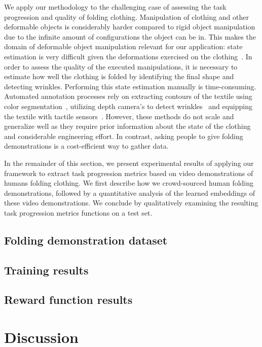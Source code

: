 \documentclass[\home/main.tex]{subfiles}
\begin{document}

We apply our methodology to the challenging case of assessing the task progression and quality of folding clothing. Manipulation of clothing and other deformable objects is considerably harder compared to rigid object manipulation due to the infinite amount of configurations the object can be in. This makes the domain of deformable object manipulation relevant for our application: state estimation is very difficult given the deformations exercised on the clothing~\cite{Foresti2004}. In order to assess the quality of the executed manipulations, it is necessary to estimate how well the clothing is folded by identifying the final shape and detecting wrinkles. Performing this state estimation manually is time-consuming. Automated annotation processes rely on extracting contours of the textile using color segmentation~\cite{Miller2012}, utilizing depth camera's to detect wrinkles~\cite{Doumanoglou2016} and equipping the textile with tactile sensors~\cite{Verleysen2020-folding}. However, these methods do not scale and generalize well as they require prior information about the state of the clothing and considerable engineering effort. In contrast, asking people to give folding demonstrations is a cost-efficient way to gather data. 

In the remainder of this section, we present experimental results of applying our framework to extract task progression metrics based on video demonstrations of humans folding clothing. We first describe how we crowd-sourced human folding demonstrations, followed by a quantitative analysis of the learned embeddings of these video demonstrations. We conclude by qualitatively examining the resulting task progression metrics functions on a test set. 

\subsection{Folding demonstration dataset}
\subsection{Training results}
\subsection{Reward function results}

\section{Discussion}\label{sec:reward_discuss}
\end{document}
